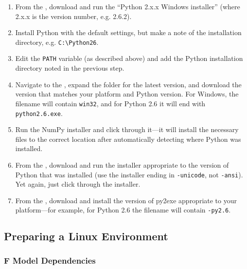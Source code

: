 \begin{enumerate}

\item From the , download and run the 
``Python 2.x.x Windows installer'' (where 2.x.x is the version number, e.g. 2.6.2).

\item Install Python with the default settings, but make a note of the installation directory, e.g.
\verb|C:\Python26|.

\item Edit the \verb|PATH| variable (as described above) and add the Python installation directory 
noted in the previous step.

\item Navigate to the , expand 
the folder for the latest version, and download the version that matches your platform and Python 
version.  For Windows, the filename will contain \verb|win32|, and for Python 2.6 it will end with 
\verb|python2.6.exe|.

\item Run the NumPy installer and click through it---it will install the necessary files to the 
correct location after automatically detecting where Python was installed.

\item From the , 
download and run the installer appropriate to the version of Python that was installed (use the 
installer ending in \verb|-unicode|, not \verb|-ansi|).  Yet again, just click through the 
installer.

\item From the , download 
and install the version of py2exe appropriate to your platform---for example, for Python 2.6 the 
filename will contain \verb|-py2.6|.

\end{enumerate}


\subsection{Preparing a Linux Environment}
\label{dev:linux}

\subsubsection{F Model Dependencies}

